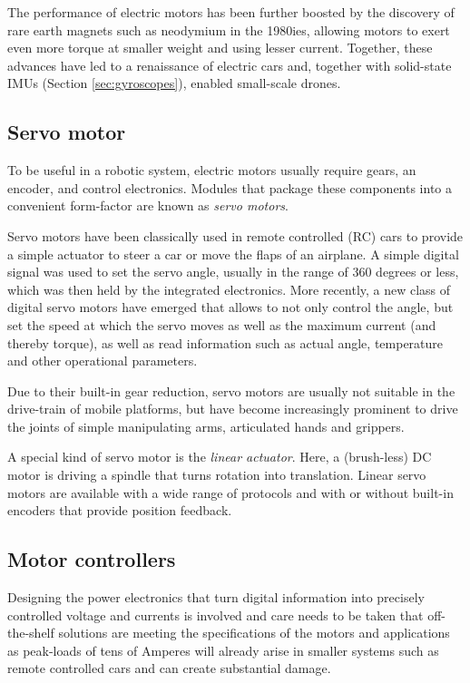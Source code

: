 The performance of electric motors has been further boosted by the discovery of rare earth magnets such as neodymium in the 1980ies, allowing motors to exert even more torque at smaller weight and using lesser current. Together, these advances have led to a renaissance of electric cars and, together with solid-state IMUs (Section \ref{sec:gyroscopes}), enabled small-scale drones.

\subsection{Servo motor}
To be useful in a robotic system, electric motors usually require gears, an encoder, and control electronics. Modules that package these components into a convenient form-factor are known as \emph{servo motors}. 

Servo motors have been classically used in remote controlled (RC) cars to provide a simple actuator to steer a car or move the flaps of an airplane. A simple digital signal was used to set the servo angle, usually in the range of 360 degrees or less, which was then held by the integrated electronics. More recently, a new class of digital servo motors have emerged that allows to not only control the angle, but set the speed at which the servo moves as well as the maximum current (and thereby torque), as well as read information such as actual angle, temperature and other operational parameters. 

Due to their built-in gear reduction, servo motors are usually not suitable in the drive-train of mobile platforms, but have become increasingly prominent to drive the joints of simple manipulating arms, articulated hands and grippers. 

A special kind of servo motor is the \emph{linear actuator}. Here, a (brush-less) DC motor is driving a spindle that turns rotation into translation. Linear servo motors are available with a wide range of protocols and with or without built-in encoders that provide position feedback.

\subsection{Motor controllers}
Designing the power electronics that turn digital information into precisely controlled voltage and currents is involved and care needs to be taken that off-the-shelf solutions are meeting the specifications of the motors and applications as peak-loads of tens of Amperes will already arise in smaller systems such as remote controlled cars and can create substantial damage.

